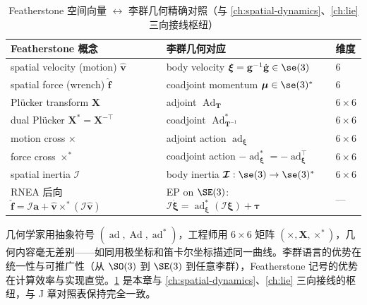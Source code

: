 \begin{table}[H]\centering\small
\caption{Featherstone 空间向量 $\leftrightarrow$ 李群几何精确对照（与 \cref{ch:spatial-dynamics}、\cref{ch:lie} 三向接线枢纽）}
\label{tab:gm-featherstone}
\begin{tabular}{lll}
\toprule
Featherstone 概念 & 李群几何对应 & 维度\\
\midrule
spatial velocity (motion) $\hat{\mathbf v}$ & body velocity $\boldsymbol\xi=\mathbf g^{-1}\dot{\mathbf g}\in\se(3)$ & 6\\
spatial force (wrench) $\hat{\mathbf f}$ & coadjoint momentum $\boldsymbol\mu\in\se(3)^*$ & 6\\
Plücker transform $\mathbf X$ & adjoint $\operatorname{Ad}_{\mathbf T}$ & $6\times6$\\
dual Plücker $\mathbf X^*=\mathbf X^{-\top}$ & coadjoint $\operatorname{Ad}^*_{\mathbf T^{-1}}$ & $6\times6$\\
motion cross $\times$ & adjoint action $\operatorname{ad}_{\boldsymbol\xi}$ & $6\times6$\\
force cross $\times^*$ & coadjoint action $-\operatorname{ad}^*_{\boldsymbol\xi}=-\operatorname{ad}_{\boldsymbol\xi}^\top$ & $6\times6$\\
spatial inertia $\boldsymbol{\mathcal I}$ & body inertia $\boldsymbol{\mathcal I}:\se(3)\to\se(3)^*$ & $6\times6$\\
RNEA 后向 $\hat{\mathbf f}=\boldsymbol{\mathcal I}\mathbf a+\hat{\mathbf v}\times^*(\boldsymbol{\mathcal I}\hat{\mathbf v})$ & EP on $\SE(3)$: $\boldsymbol{\mathcal I}\dot{\boldsymbol\xi}=\operatorname{ad}^*_{\boldsymbol\xi}(\boldsymbol{\mathcal I}\boldsymbol\xi)+\boldsymbol\tau$ & ---\\
\bottomrule
\end{tabular}
\end{table}

\begin{insight}
几何学家用抽象符号 $(\operatorname{ad},\operatorname{Ad},\operatorname{ad}^*)$，工程师用 $6\times6$ 矩阵 $(\times,\mathbf X,\times^*)$，几何内容毫无差别——如同用极坐标和笛卡尔坐标描述同一曲线。李群语言的优势在统一性与可推广性（从 $\SO(3)$ 到 $\SE(3)$ 到任意李群），Featherstone 记号的优势在计算效率与实现直觉。\cref{tab:gm-featherstone} 是本章与 \cref{ch:spatial-dynamics}、\cref{ch:lie} 三向接线的枢纽，与 J 章对照表保持完全一致。
\end{insight}

